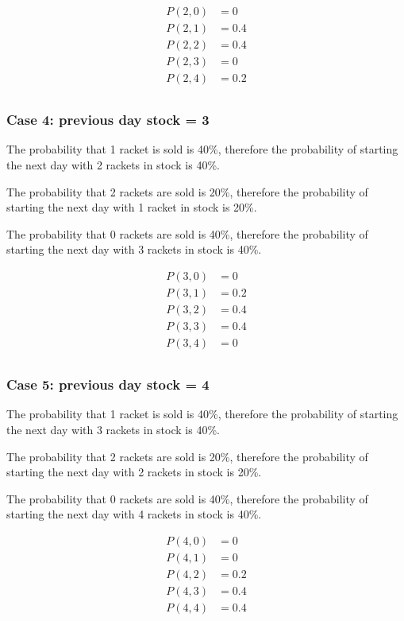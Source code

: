 \documentclass[12pt]{article}
\begin{document}
\begin{enumerate}
\begin{enumerate}
\begin{align*}
P(2, 0) &= 0 \\
P(2, 1) &= 0.4 \\
P(2, 2) &= 0.4 \\
P(2, 3) &= 0 \\
P(2, 4) &= 0.2 \\
\end{align*}

\subsubsection*{Case 4: previous day stock = 3}

The probability that 1 racket is sold is 40\%, therefore the probability of starting the next day with 2 rackets in stock is 40\%. 

The probability that 2 rackets are sold is 20\%, therefore the probability of starting the next day with 1 racket in stock is 20\%. 

The probability that 0 rackets are sold is 40\%, therefore the probability of starting the next day with 3 rackets in stock is 40\%.

\begin{align*}
P(3, 0) &= 0 \\
P(3, 1) &= 0.2 \\
P(3, 2) &= 0.4 \\
P(3, 3) &= 0.4 \\
P(3, 4) &= 0 \\
\end{align*}

\subsubsection*{Case 5: previous day stock = 4}
The probability that 1 racket is sold is 40\%, therefore the probability of starting the next day with 3 rackets in stock is 40\%.

The probability that 2 rackets are sold is 20\%, therefore the probability of starting the next day with 2 rackets in stock is 20\%.

The probability that 0 rackets are sold is 40\%, therefore the probability of starting the next day with 4 rackets in stock is 40\%.

\begin{align*}
P(4, 0) &= 0 \\
P(4, 1) &= 0 \\
P(4, 2) &= 0.2 \\
P(4, 3) &= 0.4 \\
P(4, 4) &= 0.4 \\
\end{align*}


\end{enumerate}
\end{enumerate}
\end{document}
